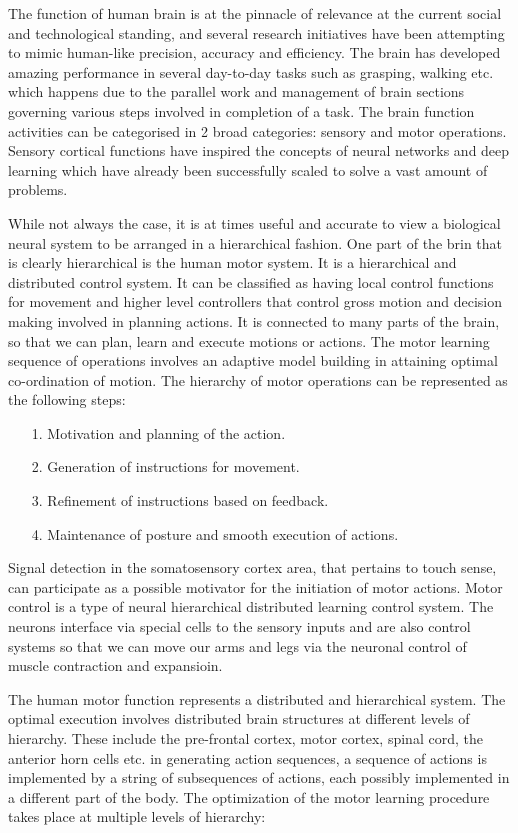 \documentclass[conference]{IEEEtran}
\begin{document}
The function of human brain is at the pinnacle of relevance at the current social and technological standing, and several research initiatives have been attempting to mimic human-like precision, accuracy and efficiency. The brain has developed amazing performance in several day-to-day tasks such as grasping, walking etc. which happens due to the parallel work and management of brain sections governing various steps involved in completion of a task. The brain function activities can be categorised in 2 broad categories: sensory and motor operations. Sensory cortical functions have inspired the concepts of neural networks and deep learning which have already been successfully scaled to solve a vast amount of problems.

While not always the case, it is at times useful and accurate to view a biological neural system to be arranged in a hierarchical fashion. One part of the brin that is clearly hierarchical is the human motor system. It is a hierarchical and distributed control system. It can be classified as having local control functions for movement and higher level controllers that control gross motion and decision making involved in planning actions. It is connected to many parts of the brain, so that we can plan, learn and execute motions or actions. The motor learning sequence of operations involves an adaptive model building in attaining optimal co-ordination of motion. The hierarchy of motor operations can be represented as the following steps:
\begin{itemize}
	\item[1.] Motivation and planning of the action.
	\item[2.] Generation of instructions for movement.
	\item[3.] Refinement of instructions based on feedback.
	\item[4.] Maintenance of posture and smooth execution of actions.
\end{itemize}
Signal detection in the somatosensory cortex area, that pertains to touch sense, can participate as a possible motivator for the initiation of motor actions. Motor control is a type of neural hierarchical distributed learning control system. The neurons interface via special cells to the sensory inputs and are also control systems so that we can move our arms and legs via the neuronal control of muscle contraction and expansioin.

The human motor function represents a distributed and hierarchical system. The optimal execution involves distributed brain structures at different levels of hierarchy. These include the pre-frontal cortex, motor cortex, spinal cord, the anterior horn cells etc. in generating action sequences, a sequence of actions is implemented by a string of subsequences of actions, each possibly implemented in a different part of the body. The optimization of the motor learning procedure takes place at multiple levels of hierarchy:
\end{document}
